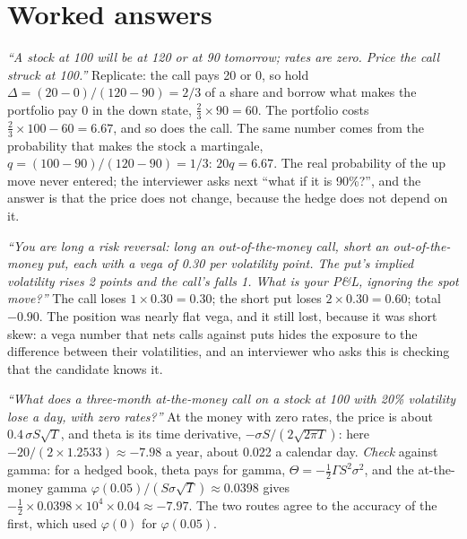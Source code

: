 \section{Worked answers}

\begin{example}\label{ex:iv:options-and-derivatives:binomial}
\emph{``A stock at 100 will be at 120 or at 90 tomorrow; rates are zero. Price the call struck at 100.''} Replicate: the
call pays 20 or 0, so hold $\Delta = (20 - 0)/(120 - 90) = 2/3$ of a share and borrow what makes the portfolio pay 0 in the
down state, $\tfrac23 \times 90 = 60$. The portfolio costs $\tfrac23 \times 100 - 60 = 6.67$, and so does the call. The
same number comes from the probability that makes the stock a martingale, $q = (100 - 90)/(120 - 90) = 1/3$: $20q = 6.67$.
The real probability of the up move never entered; the interviewer asks next ``what if it is 90\%?'', and the answer is
that the price does not change, because the hedge does not depend on it.
\end{example}

\begin{example}\label{ex:iv:options-and-derivatives:rr}
\emph{``You are long a risk reversal: long an out-of-the-money call, short an out-of-the-money put, each with a vega of 0.30
per volatility point. The put's implied volatility rises 2 points and the call's falls 1. What is your P\&L, ignoring the
spot move?''} The call loses $1 \times 0.30 = 0.30$; the short put loses $2 \times 0.30 = 0.60$; total $-0.90$. The position
was nearly flat vega, and it still lost, because it was short skew: a vega number that nets calls against puts hides the
exposure to the difference between their volatilities, and an interviewer who asks this is checking that the candidate
knows it.
\end{example}

\begin{example}\label{ex:iv:options-and-derivatives:theta}
\emph{``What does a three-month at-the-money call on a stock at 100 with 20\% volatility lose a day, with zero rates?''} At
the money with zero rates, the price is about $0.4\,\sigma S\sqrt{T}$, and theta is its time derivative, $-\sigma
S/(2\sqrt{2\pi T})$: here $-20/(2 \times 1.2533) \approx -7.98$ a year, about 0.022 a calendar day. \emph{Check} against
gamma: for a hedged book, theta pays for gamma, $\Theta = -\tfrac12\Gamma S^2\sigma^2$, and the at-the-money gamma
$\varphi(0.05)/(S\sigma\sqrt T) \approx 0.0398$ gives $-\tfrac12 \times 0.0398 \times 10^4 \times 0.04 \approx -7.97$. The
two routes agree to the accuracy of the first, which used $\varphi(0)$ for $\varphi(0.05)$.
\end{example}

